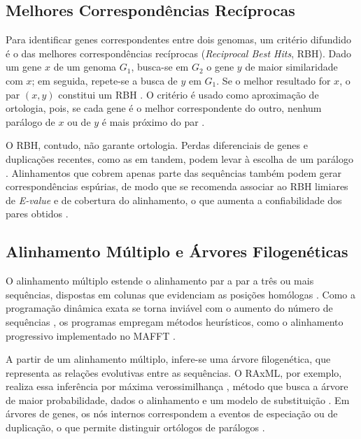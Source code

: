 \subsection{Melhores Correspondências Recíprocas}
\label{subsec:rbh}

Para identificar genes correspondentes entre dois genomas, um critério difundido é o das melhores correspondências recíprocas (\textit{Reciprocal Best Hits}, RBH). Dado um gene $x$ de um genoma $G_1$, busca-se em $G_2$ o gene $y$ de maior similaridade com $x$; em seguida, repete-se a busca de $y$ em $G_1$. Se o melhor resultado for $x$, o par $(x, y)$ constitui um RBH \cite{Overbeek1999}. O critério é usado como aproximação de ortologia, pois, se cada gene é o melhor correspondente do outro, nenhum parálogo de $x$ ou de $y$ é mais próximo do par \cite{Tatusov1997, MorenoHagelsieb2008}.

O RBH, contudo, não garante ortologia. Perdas diferenciais de genes e duplicações recentes, como as em tandem, podem levar à escolha de um parálogo \cite{MorenoHagelsieb2008}. Alinhamentos que cobrem apenas parte das sequências também podem gerar correspondências espúrias, de modo que se recomenda associar ao RBH limiares de \textit{E-value} e de cobertura do alinhamento, o que aumenta a confiabilidade dos pares obtidos \cite{MorenoHagelsieb2008}.

\subsection{Alinhamento Múltiplo e Árvores Filogenéticas}

O alinhamento múltiplo estende o alinhamento par a par a três ou mais sequências, dispostas em colunas que evidenciam as posições homólogas \cite{Durbin1998}. Como a programação dinâmica exata se torna inviável com o aumento do número de sequências \cite{Durbin1998}, os programas empregam métodos heurísticos, como o alinhamento progressivo implementado no MAFFT \cite{Katoh2013}.

A partir de um alinhamento múltiplo, infere-se uma árvore filogenética, que representa as relações evolutivas entre as sequências. O RAxML, por exemplo, realiza essa inferência por máxima verossimilhança \cite{Stamatakis2014}, método que busca a árvore de maior probabilidade, dados o alinhamento e um modelo de substituição \cite{NeiKumar2000}. Em árvores de genes, os nós internos correspondem a eventos de especiação ou de duplicação, o que permite distinguir ortólogos de parálogos \cite{Koonin2005}.

